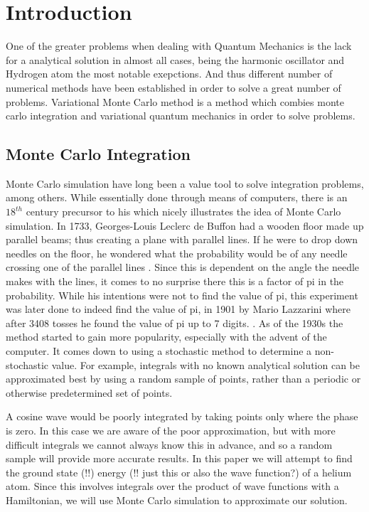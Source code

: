 

\section{Introduction}
One of the greater problems when dealing with Quantum Mechanics is the lack for a analytical solution
in almost all cases, being the harmonic oscillator and Hydrogen atom the most notable exepctions.
And thus different number of numerical methods have been established in order to solve a great number
of problems. Variational Monte Carlo method is a method which combies monte carlo integration and variational
quantum mechanics in order to solve problems.


\subsection{Monte Carlo Integration}
Monte Carlo simulation have long been a value tool to solve integration problems, among others.
While essentially done through means of computers, there is an $18^{th}$ century precursor to
his which nicely illustrates the idea of Monte Carlo simulation.
In 1733, Georges-Louis Leclerc
de Buffon had a wooden floor made up parallel beams; thus creating a plane with parallel lines.
If he were to drop down needles on the floor, he wondered what the probability would be of
any needle crossing one of the parallel lines \cite{Buffon}. Since this is dependent on the
angle the needle makes with the lines, it comes to no surprise there this is a factor of pi
in the probability. While his intentions were not to find the value of pi, this experiment
was later done to indeed find the value of pi, in 1901 by Mario Lazzarini where after 3408
tosses he found the value of pi up to 7 digits. \cite{Lazzarini}.
As of the 1930s the method started to gain more popularity, especially with the advent of the computer.
It comes down to using a stochastic method to determine a non-stochastic value. For example, integrals
with no known analytical solution can be approximated best by using a random sample of points, rather than
a periodic or otherwise predetermined set of points.

 A cosine wave would be poorly integrated by taking points
only where the phase is zero. In this case we are aware of the poor approximation, but with more difficult
integrals we cannot always know this in advance, and so a random sample will provide more accurate results.
In this paper we will attempt to find the ground state (!!) energy (!! just this or also the wave function?)
of a helium atom. Since this involves integrals over the product of wave functions with a Hamiltonian, we will
use Monte Carlo simulation to approximate our solution.

